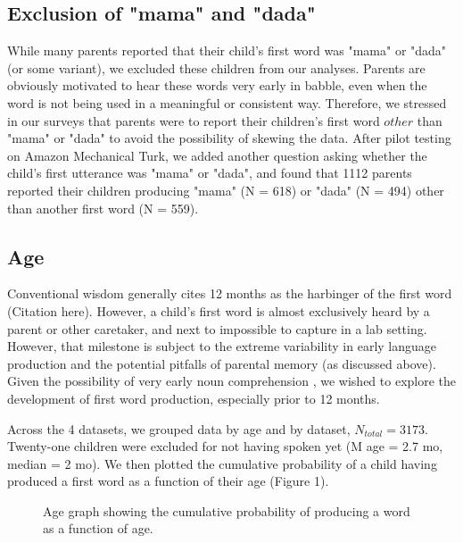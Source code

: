 \documentclass[10pt,letterpaper]{article}
\begin{document}
\subsection{Exclusion of "mama" and "dada"}
While many parents reported that their child's first word was "mama" or "dada" (or some variant), we excluded these children from our analyses. Parents are obviously motivated to hear these words very early in babble, even when the word is not being used in a meaningful or consistent way. Therefore, we stressed in our surveys that parents were to report their children's first word $other$ than "mama" or "dada" to avoid the possibility of skewing the data. After pilot testing on Amazon Mechanical Turk, we added another question asking whether the child's first utterance was "mama" or "dada", and found that 1112 parents reported their children producing "mama" (N = 618) or "dada" (N = 494) other than another first word (N = 559).   

\subsection{Age} 

Conventional wisdom generally cites 12 months as the harbinger of the first word (Citation here). However, a child's first word is almost exclusively heard by a parent or other caretaker, and next to impossible to capture in a lab setting. However, that milestone is subject to the extreme variability in early language production  \cite{fenson1994} and the potential pitfalls of parental memory (as discussed above). Given the possibility of very early noun comprehension \cite{tincoff1999,tincoff2012,bergelson2012}, we wished to explore the development of first word production, especially prior to 12 months.

Across the 4 datasets, we grouped data by age and by dataset, $N_{total} = 3173$. Twenty-one children were excluded for not having spoken yet (M age  = 2.7 mo, median = 2 mo). We then plotted the cumulative probability of a child having produced a first word as a function of their age (Figure 1).

\begin{figure}[t]
	\caption{\label{fig:cdfs}  Age graph showing the cumulative probability of producing a word as a function of age.}
\end{figure}
\end{document}
